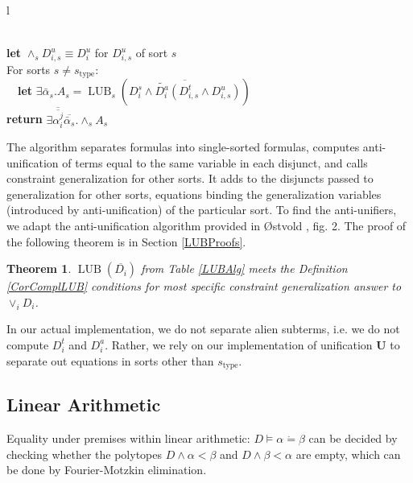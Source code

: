 \documentclass{article}
\newcommand{\tmmathbf}[1]{\ensuremath{\boldsymbol{#1}}}
\newcommand{\tmop}[1]{\ensuremath{\operatorname{#1}}}
\newcommand{\tmstrong}[1]{\textbf{#1}}
\newtheorem{theorem}{Theorem}
\begin{document}
\begin{table}[t]
\begin{tabular}{l}
\\
    {\tmstrong{let}} $\wedge_s D^u_{i, s} \equiv D^u_i$ for $D^u_{i, s}$ of
    sort $s$\\
    For sorts $s \neq s_{\tmop{type}}$:\\
    \ \ {\tmstrong{let}} $\exists \bar{\alpha}_s .A_s = \tmop{LUB}_s \left(
    \right)$\\
    {\tmstrong{return}} $\exists {}
     . \wedge_s A_s$
  \end{tabular}\label{LUBAlg}
  \caption{LUB algorithm $\tmop{LUB} (\overline{D_i}) = \exists \bar{\alpha}
  .A$}
\end{table} The algorithm separates formulas into single-sorted formulas,
computes anti-unification of terms equal to the same variable in each
disjunct, and calls constraint generalization for other sorts. It adds to the
disjuncts passed to generalization for other sorts, equations binding the
generalization variables (introduced by anti-unification) of the particular
sort. To find the anti-unifiers, we adapt the anti-unification algorithm
provided in {\O}stvold {\cite{AntiUnifAlg}}, fig. 2. The proof of the
following theorem is in Section \ref{LUBProofs}.

\begin{theorem}
  \label{CorComplLUBThm}$\tmop{LUB} ()$ from Table \ref{LUBAlg}
  meets the Definition \ref{CorComplLUB} conditions for most specific
  constraint generalization answer to $\vee_i D_i$.
\end{theorem}

In our actual implementation, we do not separate alien subterms, i.e. we do
not compute $D_i^t$ and $D_i^a$. Rather, we rely on our implementation of
unification $\tmmathbf{U}$ to separate out equations in sorts other than
$s_{\tmop{type}}$.

\subsection{Linear Arithmetic}

Equality under premises within linear arithmetic: $D \vDash \alpha \dot{=}
\beta$ can be decided by checking whether the polytopes $D \wedge \alpha <
\beta$ and $D \wedge \beta < \alpha$ are empty, which can be done by
Fourier-Motzkin elimination.
\end{document}
